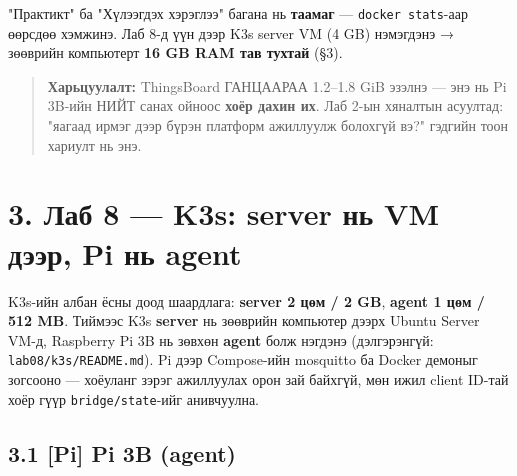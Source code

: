 "Практикт" ба "Хүлээгдэх хэрэглээ" багана нь \textbf{таамаг} --- \texttt{docker\ stats}-аар өөрсдөө хэмжинэ. Лаб 8-д үүн дээр K3s server VM (4 GB) нэмэгдэнэ → зөөврийн компьютерт \textbf{16 GB RAM тав тухтай} (§3).

\begin{quote}
\textbf{Харьцуулалт:} ThingsBoard ГАНЦААРАА 1.2--1.8 GiB эзэлнэ --- энэ нь Pi 3B-ийн НИЙТ санах ойноос \textbf{хоёр дахин их}. Лаб 2-ын хяналтын асуултад: "яагаад ирмэг дээр бүрэн платформ ажиллуулж болохгүй вэ?" гэдгийн тоон хариулт нь энэ.
\end{quote}

\hypertarget{ux43bux430ux431-8-k3s-server-ux43dux44c-vm-ux434ux44dux44dux440-pi-ux43dux44c-agent}{%
\section{3. Лаб 8 --- K3s: server нь VM дээр, Pi нь agent}\label{ux43bux430ux431-8-k3s-server-ux43dux44c-vm-ux434ux44dux44dux440-pi-ux43dux44c-agent}}

K3s-ийн албан ёсны доод шаардлага: \textbf{server 2 цөм / 2 GB}, \textbf{agent 1 цөм / 512 MB}. Тиймээс K3s \textbf{server} нь зөөврийн компьютер дээрх Ubuntu Server VM-д, Raspberry Pi 3B нь зөвхөн \textbf{agent} болж нэгдэнэ (дэлгэрэнгүй: \texttt{lab08/\allowbreak{}k3s/\allowbreak{}README.\allowbreak{}md}). Pi дээр Compose-ийн mosquitto ба Docker демоныг зогсооно --- хоёуланг зэрэг ажиллуулах орон зай байхгүй, мөн ижил client ID-тай хоёр гүүр \texttt{bridge/state}-ийг анивчуулна.

\hypertarget{pi-pi-3b-agent}{%
\subsection{3.1 {[}Pi{]} Pi 3B (agent)}\label{pi-pi-3b-agent}}

